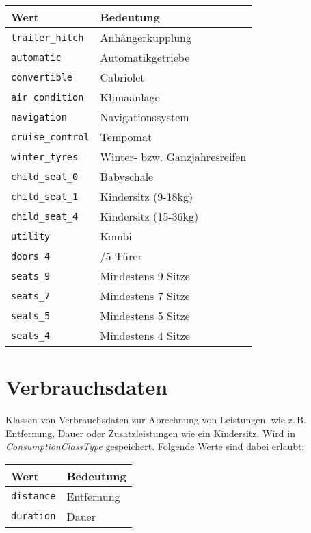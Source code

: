 \begin{flushleft}
\begin{tabularx}{\linewidth}{l>{\raggedright\arraybackslash}X}
\toprule
Wert & Bedeutung\\
\midrule
\verb|trailer_hitch| & Anhängerkupplung\\
\verb|automatic| & Automatikgetriebe\\
\verb|convertible| & Cabriolet\\
\verb|air_condition| & Klimaanlage\\
\verb|navigation| & Navigationssystem\\
\verb|cruise_control| & Tempomat\\
\verb|winter_tyres| & Winter- bzw. Ganzjahresreifen\\
\verb|child_seat_0| & Babyschale\\
\verb|child_seat_1| & Kindersitz (9-18kg)\\
\verb|child_seat_4| & Kindersitz (15-36kg)\\
\verb|utility| & Kombi\\
\verb|doors_4| & 4/5-Türer\\
\verb|seats_9| & Mindestens 9 Sitze\\
\verb|seats_7| & Mindestens 7 Sitze\\
\verb|seats_5| & Mindestens 5 Sitze\\
\verb|seats_4| & Mindestens 4 Sitze\\
\bottomrule
\end{tabularx}
\end{flushleft}

\section{Verbrauchsdaten}
\label{sec:CodeTabellen:ConsumptionClassType}
Klassen von Verbrauchsdaten zur Abrechnung von Leistungen, wie z.\,B. Entfernung, Dauer oder Zusatzleistungen wie ein Kindersitz. Wird in  \emph{ConsumptionClassType} gespeichert. Folgende Werte sind dabei erlaubt:

\begin{flushleft}
\begin{tabularx}{\linewidth}{l>{\raggedright\arraybackslash}X}
\toprule
Wert & Bedeutung\\
\midrule
\verb|distance| & Entfernung\\
\verb|duration| & Dauer\\
\bottomrule
\end{tabularx}
\end{flushleft}

